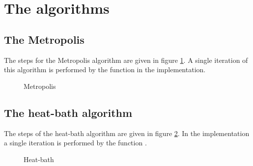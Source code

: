 \section{The algorithms}
\subsection{The Metropolis}
 
The steps for the Metropolis algorithm are given in figure \ref{alg:Metropolis}. A single iteration of this algorithm is performed by the function  in the implementation.

\begin{figure}
\centering
\begin{algorithm}[H]
\caption{Metropolis}
\label{alg:Metropolis}

\BlankLine
{}
\end{algorithm}
\end{figure}

\subsection{The heat-bath algorithm}

The steps of the heat-bath algorithm are given in figure \ref{alg:heat-bath}. In the implementation a single iteration is performed by the function .

\begin{figure}
\centering
\begin{algorithm}[H]
\caption{Heat-bath}
\label{alg:heat-bath}

\BlankLine
{}
\end{algorithm}
\end{figure}

